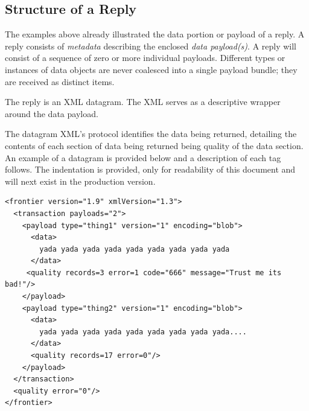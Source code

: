\subsection{Structure of a Reply}

The examples above already illustrated the data portion or payload of a reply.
A reply consists of \emph{metadata} describing the enclosed
\emph{data payload(s)}.
A reply will consist of a sequence of zero or more individual payloads.
Different types or instances of data objects are never coalesced into a single
payload bundle; they are received as distinct items.

The reply is an XML datagram.  The XML serves as a descriptive wrapper
around the data payload.

The datagram XML's protocol identifies the data being returned, detailing the contents 
of each section of data being returned being quality of the data section. An example of a 
datagram is provided below and a description of each tag follows. The indentation is provided, only
for readability of this document and will next exist in the production version.

\begin{verbatim}
<frontier version="1.9" xmlVersion="1.3">
  <transaction payloads="2">
    <payload type="thing1" version="1" encoding="blob">
      <data>
        yada yada yada yada yada yada yada yada yada
      </data>
     <quality records=3 error=1 code="666" message="Trust me its bad!"/>
    </payload>
    <payload type="thing2" version="1" encoding="blob">
      <data>
        yada yada yada yada yada yada yada yada yada....
      </data>
      <quality records=17 error=0"/>
    </payload>
  </transaction>
  <quality error="0"/>
</frontier>
\end{verbatim}

